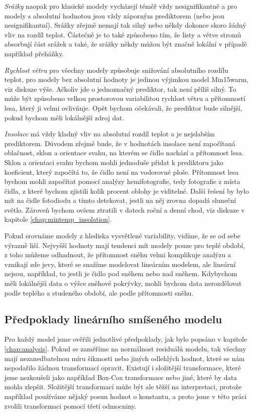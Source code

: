 \textit{Srážky} naopak pro klasické modely vycházejí téměř vždy nesignifikantně a pro modely s absolutní hodnotou jsou vždy záporným prediktorem (nebo jsou nesignifikantní). Srážky zřejmě nemají tak silný nebo někdy dokonce skoro žádný vliv na rozdíl teplot. Částečně je to také způsobeno tím, že listy a větve stromů absorbují část srážek a také, že srážky někdy můžou být značně lokální v případě například přeháňky.

\textit{Rychlost větru} pro všechny modely způsobuje snižování absolutního rozdílu teplot, pro modely bez absolutní hodnoty je jedinou výjimkou model Min15warm, viz diskuze výše. Ačkoliv jde o jednoznačný prediktor, tak není příliš silný. To může být způsobeno velkou prostorovou variabilitou rychlost větru a přítomností lesa, který ji velmi ovlivňuje. Opět bychom očekávali, že prediktor bude silnější, pokud bychom měli lokálnější zdroj dat.

\textit{Insolace} má vždy kladný vliv na absolutní rozdíl teplot a je nejslabším prediktorem. Důvodem zřejmě bude, že v hodnotách insolace není započítaná oblačnost, sklon a orientace svahu, na kterém se čidlo nachází a přítomnost lesa. Sklon a orientaci svahu bychom mohli jednoduše přidat k prediktoru jako koeficient, který započítá to, že čidlo není na vodorovné ploše. Přítomnost lesa bychom mohli započítat pomocí analýzy hemifotografie, tedy fotografie z místa čidla, z které bychom zjistili kolik procent oblohy je viditelné. Další řešení by bylo mít na čidle fotodiodu a tímto detekovat, jestli na něj zrovna dopadá sluneční světlo. Zároveň bychom ovšem ztratili v datech roční a denní chod, viz diskuze v kapitole \ref{chap:mintemp_insolation}.

Pokud srovnáme modely z hlediska vysvětlené variability, vidíme, že se od sebe výrazně liší. Nejvyšší hodnoty mají tendenci mít modely pouze pro teplé období, z toho můžeme odhadnout, že přítomnost sněhu velmi komplikuje analýzu a vznikají zde jevy, které se snažíme modelovat lineárním modelem, ale lineární nejsou, například, to jestli je čidlo pod sněhem nebo nad sněhem. Kdybychom měli lokálnější data o výšce sněhové pokrývky, mohli bychom data nerozdělovat podle teplého a studeného období, ale podle přítomnosti sněhu.

\subsection{Předpoklady lineárního smíšeného modelu}
Pro každý model jsme ověřili jednotlivé předpoklady, jak bylo popsáno v kapitole \ref{chap:analysis}. Pokud se zaměříme na normálnost residuálů modelu, tak všechny mají nezanedbatelnou míru šikmosti nebo jiných odlehlých hodnot, které se nám nepodařilo žádnou transformací opravit. Existují i složitější transformace, které jsme nezkoušeli jako například Box-Cox transformace nebo jiné, které by data mohla zlepšit. Složitější transformací může být ale těžší na interpretaci, protože například používáme nějaký posun hodnot o konstantu, a proto jsme v této práci zvolili transformaci pomocí třetí odmocniny. 

